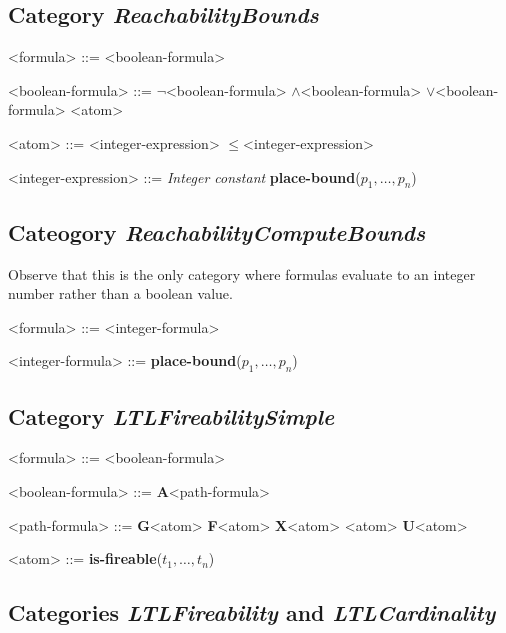 \documentclass[10pt,english,a4paper]{article}
\newcommand\ctla             {\textbf{A}\xspace}
\newcommand\ltlf             {\textbf{F}\xspace}
\newcommand\ltlg             {\textbf{G}\xspace}
\newcommand\ltlx             {\textbf{X}\xspace}
\newcommand\ltlu             {\textbf{U}\xspace}
\newcommand\logicnot         {\boldmath$\lnot$\xspace}
\newcommand\logicand         {\boldmath$\land$\xspace}
\newcommand\logicor          {\boldmath$\lor$\xspace}
\newcommand\atomleq          {\boldmath$\leq$\xspace}
\newcommand\atomisfire[1]    {\textbf{is-fireable}(#1)}
\newcommand\atomplacebnd[1]  {\textbf{place-bound}(#1)}
\begin{document}
\subsection{Category \textit{ReachabilityBounds}}

\begin{grammar}

<formula> ::= <boolean-formula>

<boolean-formula> ::=  \logicnot <boolean-formula>
 \logicand <boolean-formula>
 \logicor  <boolean-formula>
\alt <atom>

<atom> ::= <integer-expression> \atomleq <integer-expression>

<integer-expression> ::= \textit{Integer constant}
\alt \atomplacebnd{$p_1, \ldots, p_n$}

\end{grammar}

\subsection{Cateogory \textit{ReachabilityComputeBounds}}

Observe that this is the only category where formulas evaluate to an
integer number rather than a boolean value.

\begin{grammar}
<formula> ::= <integer-formula>

<integer-formula> ::= \atomplacebnd{$p_1, \ldots, p_n$}
\end{grammar}


\subsection{Category \textit{LTLFireabilitySimple}}

\begin{grammar}
<formula> ::= <boolean-formula>

<boolean-formula> ::= \ctla <path-formula>

<path-formula> ::=
     \ltlg <atom>
\alt \ltlf <atom>
\alt \ltlx <atom>
\alt <atom> \ltlu <atom>

<atom> ::= \atomisfire{$t_1, \ldots, t_n$}
\end{grammar}

\subsection{Categories \textit{LTLFireability} and \textit{LTLCardinality}}
\end{document}
